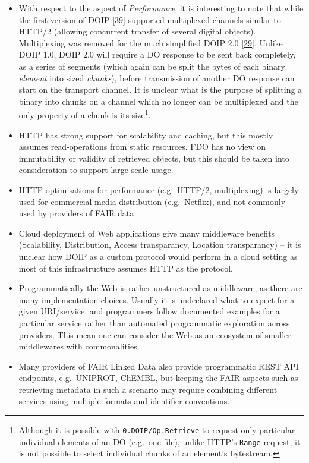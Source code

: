 \begin{itemize}
\tightlist
\item
  With respect to the aspect of \emph{Performance}, it is interesting to note that while the first version of DOIP {[}\protect\hyperlink{ref-16uB3jxpa}{39}{]} supported multiplexed channels similar to HTTP/2 (allowing concurrent transfer of several digital objects). Multiplexing was removed for the much simplified DOIP 2.0 {[}\protect\hyperlink{ref-13TcbsZF6}{29}{]}. Unlike DOIP 1.0, DOIP 2.0 will require a DO response to be sent back completely, as a series of segments (which again can be split the bytes of each binary \emph{element} into sized \emph{chunks}), before transmission of another DO response can start on the transport channel. It is unclear what is the purpose of splitting a binary into chunks on a channel which no longer can be multiplexed and the only property of a chunk is its size\footnote{Although it is possible with \texttt{0.DOIP/Op.Retrieve} to request only particular individual elements of an DO (e.g.~one file), unlike HTTP's \texttt{Range} request, it is not possible to select individual chunks of an element's bytestream.}.
\item
  HTTP has strong support for scalability and caching, but this mostly assumes read-operations from static resources. FDO has no view on immutability or validity of retrieved objects, but this should be taken into consideration to support large-scale usage.
\item
  HTTP optimisations for performance (e.g.~HTTP/2, multiplexing) is largely used for commercial media distribution (e.g.~Netflix), and not commonly used by providers of FAIR data
\item
  Cloud deployment of Web applications give many middleware benefits (Scalability, Distribution, Access transparancy, Location transparancy) -- it is unclear how DOIP as a custom protocol would perform in a cloud setting as most of this infrastructure assumes HTTP as the protocol.
\item
  Programmatically the Web is rather unstructured as middleware, as there are many implementation choices. Usually it is undeclared what to expect for a given URI/service, and programmers follow documented examples for a particular service rather than automated programmatic exploration across providers. This mean one can consider the Web as an ecosystem of smaller middlewares with commonalities.
\item
  Many providers of FAIR Linked Data also provide programmatic REST API endpoints, e.g.~\href{https://www.uniprot.org/help/programmatic_access}{UNIPROT}, \href{https://chembl.gitbook.io/chembl-interface-documentation/web-services}{ChEMBL}, but keeping the FAIR aspects such as retrieving metadata in such a scenario may require combining different services using multiple formats and identifier conventions.
\end{itemize}

